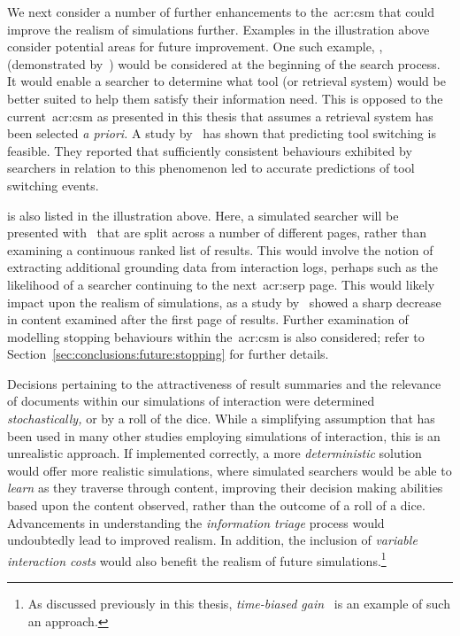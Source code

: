 We next consider a number of further enhancements to the~\gls{acr:csm} that could improve the realism of simulations further. Examples in the illustration above consider potential areas for future improvement. One such example, , (demonstrated by~\cite{thomas2014modelling_behaviour}) would be considered at the beginning of the search process. It would enable a searcher to determine what tool (or retrieval system) would be better suited to help them satisfy their information need. This is opposed to the current~\gls{acr:csm} as presented in this thesis that assumes a retrieval system has been selected \emph{a priori.} A study by~\cite{white2009tool_switching} has shown that predicting tool switching is feasible. They reported that sufficiently consistent behaviours exhibited by searchers in relation to this phenomenon led to accurate predictions of tool switching events.

 is also listed in the illustration above. Here, a simulated searcher will be presented with~ that are split across a number of different pages, rather than examining a continuous ranked list of results. This would involve the notion of extracting additional grounding data from interaction logs, perhaps such as the likelihood of a searcher continuing to the next~\gls{acr:serp} page. This would likely impact upon the realism of simulations, as a study by~\cite{jansen2005analysis} showed a sharp decrease in content examined after the first page of results. Further examination of modelling stopping behaviours within the~\gls{acr:csm} is also considered; refer to Section~\ref{sec:conclusions:future:stopping} for further details.

 Decisions pertaining to the attractiveness of result summaries and the relevance of documents within our simulations of interaction were determined \emph{stochastically,} or by a roll of the dice. While a simplifying assumption that has been used in many other studies employing simulations of interaction, this is an unrealistic approach. If implemented correctly, a more \emph{deterministic} solution would offer more realistic simulations, where simulated searchers would be able to \emph{learn} as they traverse through content, improving their decision making abilities based upon the content observed, rather than the outcome of a roll of a dice. Advancements in understanding the \emph{information triage} process would undoubtedly lead to improved realism. In addition, the inclusion of \emph{variable interaction costs} would also benefit the realism of future simulations.\footnote{As discussed previously in this thesis, \emph{time-biased gain}~\citep{smucker2012tbg} is an example of such an approach.}

